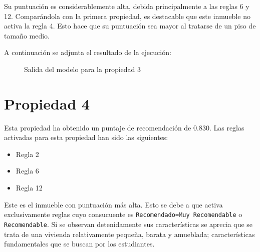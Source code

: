 \documentclass[12pt]{report} %
\begin{document}
    Su puntuación es considerablemente alta, debida principalmente a las reglas
    6 y 12. Comparándola con la primera propiedad, es destacable que este
    inmueble no activa la regla 4. Esto hace que su puntuación sea mayor al
    tratarse de un piso de tamaño medio.

    A continuación se adjunta el resultado de la ejecución:
    \begin{figure}[H]
        \centering
        \caption{Salida del modelo para la propiedad 3}
    \end{figure}

    \section{Propiedad 4}
    Esta propiedad ha obtenido un puntaje de recomendación de $0.830$. Las reglas activadas para esta propiedad han sido las siguientes: 
    \begin{itemize}
        \item Regla 2
        \item Regla 6
        \item Regla 12
    \end{itemize}
    
    Este es el inmueble con puntuación más alta. Esto se debe a que activa
    exclusivamente reglas cuyo consucuente es \texttt{Recomendado=Muy
    Recomendable} o \texttt{Recomendable}. Si se observan detenidamente sus
    características se aprecia que se trata de una vivienda relativamente
    pequeña, barata y amueblada; características fundamentales que se buscan
    por los estudiantes.
\end{document}
